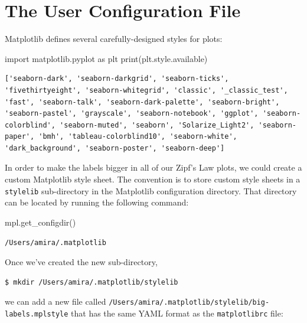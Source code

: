 \documentclass[
]{krantz}
\makeatletter
\newenvironment{Shaded}{\begin{snugshade}}{\end{snugshade}}
\newcommand{\BuiltInTok}[1]{#1}
\newcommand{\ImportTok}[1]{#1}
\newcommand{\NormalTok}[1]{#1}
\newenvironment{kframe}{%
\medskip{}
\setlength{\fboxsep}{.8em}
 \def\at@end@of@kframe{}%
 \ifinner\ifhmode%
  \def\at@end@of@kframe{\end{minipage}}%
  \begin{minipage}{\columnwidth}%
 \fi\fi%
 \def\FrameCommand##1{\hskip\@totalleftmargin \hskip-\fboxsep
 \colorbox{shadecolor}{##1}\hskip-\fboxsep
     \hskip-\linewidth \hskip-\@totalleftmargin \hskip\columnwidth}%
 \MakeFramed {\advance\hsize-\width
   \@totalleftmargin\z@ \linewidth\hsize
   \@setminipage}}%
 {\par\unskip\endMakeFramed%
 \at@end@of@kframe}
\renewenvironment{Shaded}{\begin{kframe}}{\end{kframe}}
\makeatother
\begin{document}
\hypertarget{config-user}{%
\section{The User Configuration File}\label{config-user}}

Matplotlib defines several carefully-designed styles for plots:

\begin{Shaded}
\begin{Highlighting}[]
\ImportTok{import}\NormalTok{ matplotlib.pyplot }\ImportTok{as}\NormalTok{ plt}
\BuiltInTok{print}\NormalTok{(plt.style.available)}
\end{Highlighting}
\end{Shaded}

\begin{verbatim}
['seaborn-dark', 'seaborn-darkgrid', 'seaborn-ticks', 'fivethirtyeight', 'seaborn-whitegrid', 'classic', '_classic_test', 'fast', 'seaborn-talk', 'seaborn-dark-palette', 'seaborn-bright', 'seaborn-pastel', 'grayscale', 'seaborn-notebook', 'ggplot', 'seaborn-colorblind', 'seaborn-muted', 'seaborn', 'Solarize_Light2', 'seaborn-paper', 'bmh', 'tableau-colorblind10', 'seaborn-white', 'dark_background', 'seaborn-poster', 'seaborn-deep']
\end{verbatim}

In order to make the labels bigger in all of our Zipf's Law plots,
we could create a custom Matplotlib style sheet.
The convention is to store custom style sheets in a \texttt{stylelib} sub-directory
in the Matplotlib configuration directory.
That directory can be located by running the following command:

\begin{Shaded}
\begin{Highlighting}[]
\NormalTok{mpl.get\_configdir()}
\end{Highlighting}
\end{Shaded}

\begin{verbatim}
/Users/amira/.matplotlib
\end{verbatim}

Once we've created the new sub-directory,

\begin{verbatim}
$ mkdir /Users/amira/.matplotlib/stylelib
\end{verbatim}

we can add a new file called \texttt{/Users/amira/.matplotlib/stylelib/big-labels.mplstyle}
that has the same YAML format as the \texttt{matplotlibrc} file:
\end{document}

